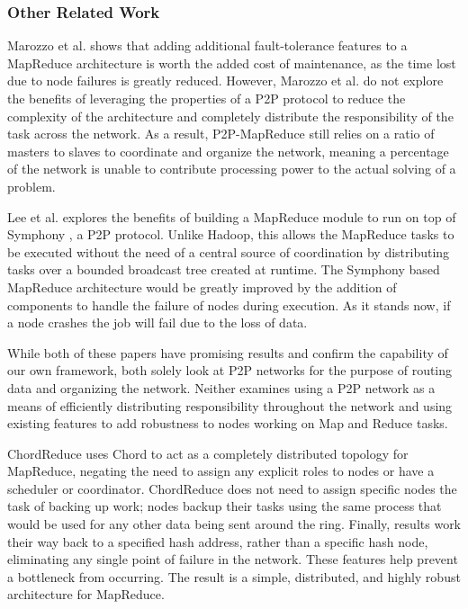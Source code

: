 \documentclass[10pt, conference, compsocconf]{IEEEtran}
\begin{document}
\subsubsection*{Other Related Work}
Marozzo et al. \cite{marozzo2012p2p} shows that adding additional fault-tolerance features to a MapReduce architecture is worth the added cost of maintenance, as the time lost due to node failures is greatly reduced.  However, Marozzo et al. do not explore the benefits of leveraging the properties of a P2P protocol to reduce the complexity of the architecture and completely distribute the responsibility of the task across the network.  As a result, P2P-MapReduce still relies on a ratio of masters to slaves to coordinate and organize the network, meaning a percentage of the network is unable to contribute processing power to the actual solving of a problem.   

Lee et al. \cite{leemap} explores the benefits of building a MapReduce module to run on top of Symphony \cite{symphony},  a P2P protocol.  Unlike Hadoop, this allows the MapReduce tasks to be executed without the need of a central source of coordination by distributing tasks over a bounded broadcast tree created at runtime.  The Symphony based MapReduce architecture would be greatly improved by the addition of components to handle the failure of nodes during execution.  As it stands now, if a node crashes the job will fail due to the loss of data.

While both of these papers have promising results and confirm the capability of our own framework, both solely look at P2P networks for the purpose of routing data and organizing the network. Neither examines using a P2P network as a means of efficiently distributing responsibility throughout the network and using existing features to add robustness to nodes working on Map and Reduce tasks.  

ChordReduce uses Chord to act as a completely distributed topology for MapReduce, negating the need to assign any explicit roles to nodes or have a scheduler or coordinator.  ChordReduce does not need to assign specific nodes the task of backing up work; nodes backup their tasks using the same process that would be used for any other data being sent around the ring.  Finally, results work their way back to a specified hash address, rather than a specific hash node, eliminating any single point of failure in the network.  These features help prevent a bottleneck from occurring. The result is a simple, distributed, and highly robust architecture for MapReduce.
\end{document}
